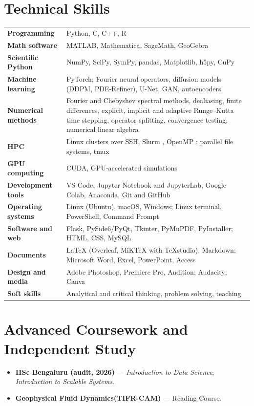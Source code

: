 \documentclass[10pt,a4paper]{article}
\newif\ifshowcreative  \showcreativetrue   %
\begin{document}
\section{Technical Skills}
\ifshowcreative
  \def\creativerow{Design and media & Adobe Photoshop, Premiere Pro, Audition; Audacity; Canva \\[1.5pt]}
\else
  \def\creativerow{}
\fi
\begin{tabularx}{\textwidth}{@{}>{\bfseries}p{3.6cm}X@{}}
Programming        & Python, C, C++, R \\[1.5pt]
Math software      & MATLAB, Mathematica, SageMath, GeoGebra \\[1.5pt]
Scientific Python  & NumPy, SciPy, SymPy, pandas, Matplotlib, h5py, CuPy \\[1.5pt]
Machine learning   & PyTorch; Fourier neural operators, diffusion models (DDPM, PDE-Refiner),
                     U-Net, GAN, autoencoders \\[1.5pt]
Numerical methods  & Fourier and Chebyshev spectral methods, dealiasing, finite differences,
                     explicit, implicit and adaptive Runge--Kutta time stepping, operator
                     splitting, convergence testing, numerical linear algebra \\[1.5pt]
HPC                & Linux clusters over SSH, Slurm , OpenMP
                     ; parallel file systems,  tmux \\[1.5pt]
GPU computing      & CUDA, GPU-accelerated simulations
                      \\[1.5pt]Development tools  & VS Code, Jupyter Notebook and JupyterLab, Google Colab, Anaconda, Git and GitHub \\[1.5pt]
Operating systems  & Linux (Ubuntu), macOS, Windows; Linux terminal, PowerShell, Command Prompt \\[1.5pt]
Software and web   & Flask, PySide6/PyQt, Tkinter, PyMuPDF, PyInstaller; HTML, CSS, MySQL \\[1.5pt]
Documents          & LaTeX (Overleaf, MiKTeX with TeXstudio), Markdown; Microsoft Word, Excel,
                     PowerPoint, Access \\[1.5pt]
\creativerow
Soft skills        & Analytical and critical thinking, problem solving, teaching \\[1.5pt]
\end{tabularx}

\section{Advanced Coursework and Independent Study}
\begin{itemize}
    \item \textbf{IISc Bengaluru (audit, 2026)} --- \emph{Introduction to Data Science};
        \emph{Introduction to Scalable Systems}.
  \item \textbf{Geophysical Fluid Dynamics(TIFR-CAM)} --- Reading Course.
\end{itemize}
\end{document}
